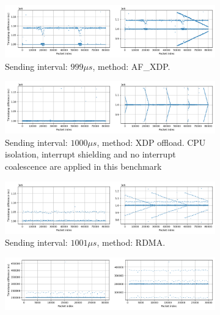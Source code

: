 \documentclass{article}
\begin{document}
        
\begin{figure}

\centering
\begin{subfigure}{\textwidth}
    \includegraphics[width=\textwidth]{fig/xsk_80k_999us_powermax_4.png}
    \caption{Sending interval: $999\mu s$, method: AF\_XDP.}
    \label{fig:999us}
\end{subfigure}
\hfill
\begin{subfigure}{\textwidth}
    \includegraphics[width=\textwidth]{fig/fide_80k_1000us.png}
    \caption{Sending interval: $1000\mu s$, method: XDP offload. CPU isolation,
    interrupt shielding and no interrupt coalescence are applied in this 
    benchmark}
    \label{fig:1000us}
\end{subfigure}
\hfill
\begin{subfigure}{\textwidth}
  \includegraphics[width=\textwidth]{fig/xsk_80k_1001us_powermax.png}
  \caption{Sending interval: $1001\mu s$, method: RDMA.}
  \label{fig:1001us}
\end{subfigure}
\hfill
\begin{subfigure}{\textwidth}
  \includegraphics[width=\textwidth]{fig/xsk_30k_200us_powermax.png}

\end{subfigure}
\end{figure}
\end{document}
